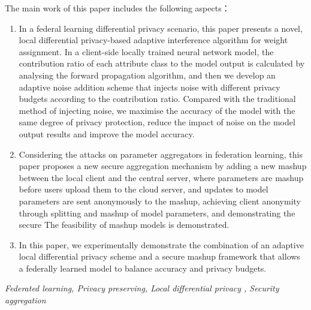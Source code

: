 The main work of this paper includes the following aspects：
\begin{enumerate}
	\item In a federal learning differential privacy scenario, this paper presents a novel, local differential privacy-based adaptive interference algorithm for weight assignment. In a client-side locally trained neural network model, the contribution ratio of each attribute class to the model output is calculated by analysing the forward propagation algorithm, and then we develop an adaptive noise addition scheme that injects noise with different privacy budgets according to the contribution ratio. Compared with the traditional method of injecting noise, we maximise the accuracy of the model with the same degree of privacy protection, reduce the impact of noise on the model output results and improve the model accuracy.
	\item Considering the attacks on parameter aggregators in federation learning, this paper proposes a new secure aggregation mechanism by adding a new mashup between the local client and the central server, where parameters are mashup before users upload them to the cloud server, and updates to model parameters are sent anonymously to the mashup, achieving client anonymity through splitting and mashup of model parameters, and demonstrating the secure The feasibility of mashup models is demonstrated.
	\item In this paper, we experimentally demonstrate the combination of an adaptive local differential privacy scheme and a secure mashup framework that allows a federally learned model to balance accuracy and privacy budgets.
\end{enumerate}
{} \textit{Federated learning, Privacy preserving, Local differential privacy , Security aggregation}


